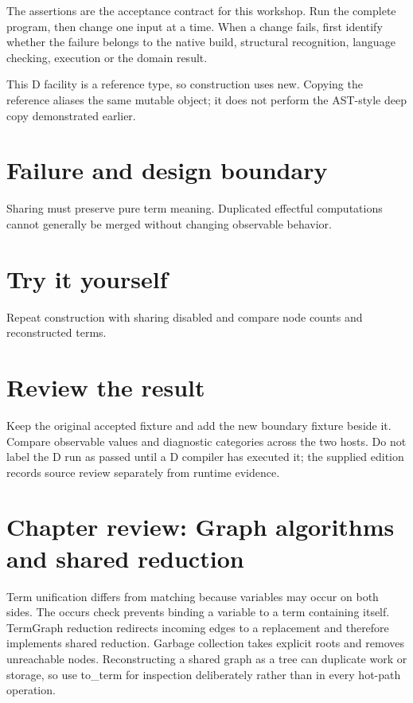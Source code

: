 The assertions are the acceptance contract for this workshop. Run the complete program, then change one input at a time. When a change fails, first identify whether the failure belongs to the native build, structural recognition, language checking, execution or the domain result.

\clearpage
{}
This D facility is a reference type, so construction uses new. Copying the reference aliases the same mutable object; it does not perform the AST-style deep copy demonstrated earlier.


\section*{Failure and design boundary}
Sharing must preserve pure term meaning. Duplicated effectful computations cannot generally be merged without changing observable behavior.

\section*{Try it yourself}
Repeat construction with sharing disabled and compare node counts and reconstructed terms.

\section*{Review the result}
Keep the original accepted fixture and add the new boundary fixture beside it. Compare observable values and diagnostic categories across the two hosts. Do not label the D run as passed until a D compiler has executed it; the supplied edition records source review separately from runtime evidence.

\clearpage
\section*{Chapter review: Graph algorithms and shared reduction}
Term unification differs from matching because variables may occur on both sides. The occurs check prevents binding a variable to a term containing itself. TermGraph reduction redirects incoming edges to a replacement and therefore implements shared reduction. Garbage collection takes explicit roots and removes unreachable nodes. Reconstructing a shared graph as a tree can duplicate work or storage, so use to\_term for inspection deliberately rather than in every hot-path operation.

